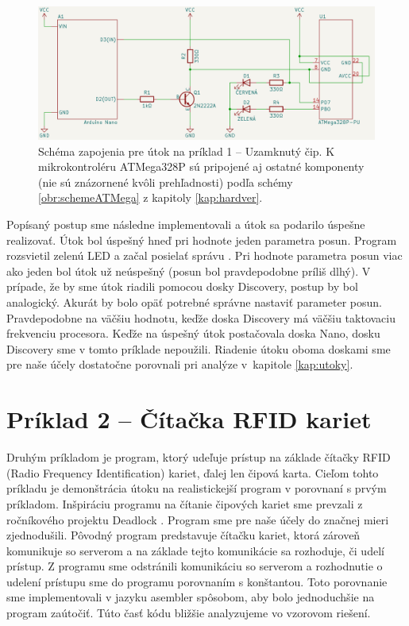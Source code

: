 \begin{figure}
    \centerline{\includegraphics[width=1\textwidth]{images/schemeCTF-LED.png}}
    \caption[Schéma zapojenia pre útok na príklad 1]{Schéma zapojenia pre útok na príklad 1 -- Uzamknutý čip. K mikrokontroléru ATMega328P sú pripojené aj ostatné komponenty (nie sú znázornené kvôli prehľadnosti) podľa schémy \ref{obr:schemeATMega} z kapitoly \ref{kap:hardver}.}
    \label{obr:schemeCTF-LED}
\end{figure}

Popísaný postup sme následne implementovali a útok sa podarilo úspešne realizovať. Útok bol úspešný hneď pri hodnote jeden parametra posun. Program rozsvietil zelenú LED a začal posielať správu . Pri hodnote parametra posun viac ako jeden bol útok už neúspešný (posun bol pravdepodobne príliš dlhý). V prípade, že by sme útok riadili pomocou dosky Discovery, postup by bol analogický. Akurát by bolo opäť potrebné správne nastaviť parameter posun. Pravdepodobne na väčšiu hodnotu, keďže doska Discovery má väčšiu taktovaciu frekvenciu procesora. Keďže na úspešný útok postačovala doska Nano, dosku Discovery sme v tomto príklade nepoužili. Riadenie útoku oboma doskami sme pre naše účely dostatočne porovnali pri analýze v~kapitole \ref{kap:utoky}.

\section{Príklad 2 -- Čítačka RFID kariet} \label{kap4:sek:priklad2}
Druhým príkladom je program, ktorý udeľuje prístup na základe čítačky RFID (Radio Frequency Identification) kariet, ďalej len čipová karta. Cieľom tohto príkladu je demonštrácia útoku na realistickejší program v porovnaní s prvým príkladom. Inšpiráciu programu na čítanie čipových kariet sme prevzali z ročníkového projektu Deadlock \cite{deadlock}. Program sme pre naše účely do značnej mieri zjednodušili. Pôvodný program predstavuje čítačku kariet, ktorá zároveň komunikuje so serverom a na základe tejto komunikácie sa rozhoduje, či udelí prístup. Z programu sme odstránili komunikáciu so serverom a rozhodnutie o udelení prístupu sme  do programu porovnaním s konštantou. Toto porovnanie sme implementovali v jazyku asembler spôsobom, aby bolo jednoduchšie na program zaútočiť. Túto časť kódu bližšie analyzujeme vo vzorovom riešení.

